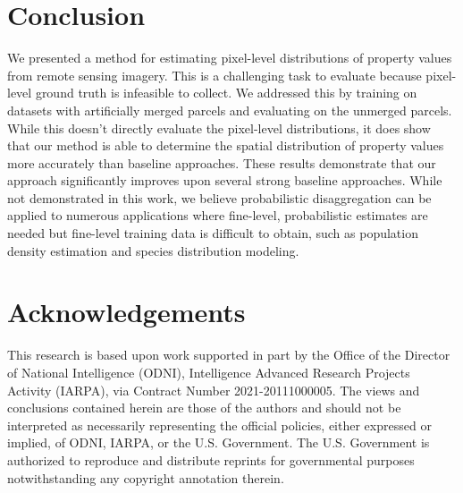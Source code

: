 \documentclass[10pt,twocolumn,a4paper]{article}
\begin{document}

\section{Conclusion}
 
We presented a method for estimating pixel-level distributions of property values from remote sensing imagery. This is a challenging task to evaluate because pixel-level ground truth is infeasible to collect. We addressed this by training on datasets with artificially merged parcels and evaluating on the unmerged parcels. While this doesn't directly evaluate the pixel-level distributions, it does show that our method is able to determine the spatial distribution of property values more accurately than baseline approaches. These results demonstrate that our approach significantly improves upon several strong baseline approaches. While not demonstrated in this work, we believe probabilistic disaggregation can be applied to numerous applications where fine-level, probabilistic estimates are needed but fine-level training data is difficult to obtain, such as population density estimation and species distribution modeling.

\section*{Acknowledgements}

This research is based upon work supported in part by the Office of the Director of National Intelligence (ODNI), Intelligence Advanced Research Projects Activity (IARPA), via Contract Number 2021-20111000005. The views and conclusions contained herein are those of the authors and should not be interpreted as necessarily representing the official policies, either expressed or implied, of ODNI, IARPA, or the U.S. Government. The U.S. Government is authorized to reproduce and distribute reprints for governmental purposes notwithstanding any copyright annotation therein.


{\small


}
\end{document}
